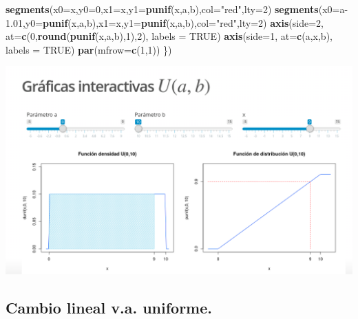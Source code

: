 \documentclass[]{book}
\newenvironment{Shaded}{\begin{snugshade}}{\end{snugshade}}
\newcommand{\DataTypeTok}[1]{\textcolor[rgb]{0.13,0.29,0.53}{#1}}
\newcommand{\DecValTok}[1]{\textcolor[rgb]{0.00,0.00,0.81}{#1}}
\newcommand{\FloatTok}[1]{\textcolor[rgb]{0.00,0.00,0.81}{#1}}
\newcommand{\KeywordTok}[1]{\textcolor[rgb]{0.13,0.29,0.53}{\textbf{#1}}}
\newcommand{\NormalTok}[1]{#1}
\newcommand{\OtherTok}[1]{\textcolor[rgb]{0.56,0.35,0.01}{#1}}
\newcommand{\StringTok}[1]{\textcolor[rgb]{0.31,0.60,0.02}{#1}}
\begin{document}
\begin{Shaded}
\begin{Highlighting}[]
  \KeywordTok{segments}\NormalTok{(}\DataTypeTok{x0=}\NormalTok{x,}\DataTypeTok{y0=}\DecValTok{0}\NormalTok{,}\DataTypeTok{x1=}\NormalTok{x,}\DataTypeTok{y1=}\KeywordTok{punif}\NormalTok{(x,a,b),}\DataTypeTok{col=}\StringTok{"red"}\NormalTok{,}\DataTypeTok{lty=}\DecValTok{2}\NormalTok{)}
  \KeywordTok{segments}\NormalTok{(}\DataTypeTok{x0=}\NormalTok{a}\FloatTok{-1.01}\NormalTok{,}\DataTypeTok{y0=}\KeywordTok{punif}\NormalTok{(x,a,b),}\DataTypeTok{x1=}\NormalTok{x,}\DataTypeTok{y1=}\KeywordTok{punif}\NormalTok{(x,a,b),}\DataTypeTok{col=}\StringTok{"red"}\NormalTok{,}\DataTypeTok{lty=}\DecValTok{2}\NormalTok{)}
  \KeywordTok{axis}\NormalTok{(}\DataTypeTok{side=}\DecValTok{2}\NormalTok{, }\DataTypeTok{at=}\KeywordTok{c}\NormalTok{(}\DecValTok{0}\NormalTok{,}\KeywordTok{round}\NormalTok{(}\KeywordTok{punif}\NormalTok{(x,a,b),}\DecValTok{1}\NormalTok{),}\DecValTok{2}\NormalTok{), }\DataTypeTok{labels =} \OtherTok{TRUE}\NormalTok{)}
  \KeywordTok{axis}\NormalTok{(}\DataTypeTok{side=}\DecValTok{1}\NormalTok{, }\DataTypeTok{at=}\KeywordTok{c}\NormalTok{(a,x,b), }\DataTypeTok{labels =} \OtherTok{TRUE}\NormalTok{)}
  \KeywordTok{par}\NormalTok{(}\DataTypeTok{mfrow=}\KeywordTok{c}\NormalTok{(}\DecValTok{1}\NormalTok{,}\DecValTok{1}\NormalTok{))}
\NormalTok{\})}
\end{Highlighting}
\end{Shaded}

\href{https://joanby.shinyapps.io/DistribucionesNotables/}{\includegraphics{Images/noshinyImages/interactiva_uniforme1.png}}

\hypertarget{cambio-lineal-v.a.-uniforme.}{%
\subsection{Cambio lineal v.a. uniforme.}\label{cambio-lineal-v.a.-uniforme.}}
\end{document}
